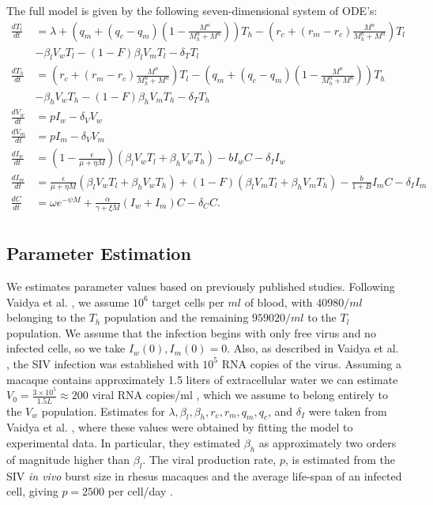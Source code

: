 \documentclass[11pt, oneside]{article}    %
\begin{document}
\vspace{5mm}

	The full model is given by the following seven-dimensional system of ODE's:
\begin{align*}
\frac{d T_l}{dt} & =  \lambda + \left(q_m + (q_c - q_m) \left(1- \frac{M^n}{M_h^n + M^n}\right) \right) T_h - \left(r_c + (r_m - r_c) \frac{M^n}{M_h^n + M^n} \right)T_l \\
 	&  - \beta_l V_w T_l - (1-F) \beta_l V_m T_l - \delta_T T_l\\
\frac{d T_h}{dt}  & =  \left(r_c + (r_m - r_c) \frac{M^n}{M_h^n + M^n} \right) T_l -  \left(q_m + (q_c - q_m) \left(1- \frac{M^n}{M_h^n + M^n}\right) \right) T_h \\
	& - \beta_h V_w T_h - (1-F) \beta_h V_m T_h - \delta_T T_h\\
\frac{d V_w}{dt}  & =  p I_w - \delta_V V_w \\
\frac{d V_m}{dt} & =  p I_m - \delta_V V_m \\
\frac{d I_w}{dt} & =  (1-\frac{\epsilon}{\mu + \eta M})(\beta_l V_w T_l + \beta_h V_w T_h) - b I_w C - \delta_I I_w \\
\frac{d I_m}{dt} & = \frac{\epsilon}{\mu + \eta M}(\beta_l V_w T_l + \beta_h V_w T_h) + (1-F) (\beta_l V_m T_l +\beta_h V_m T_h) -\frac{b} {1+B} I_m C -\delta_I I_m\\
\frac{d C}{dt} & =  \omega e^{-\psi M} + \frac{\alpha}{\gamma + \xi M}(I_w + I_m)C - \delta_C C.\\
\end{align*}

\subsection{Parameter Estimation}

	We estimates parameter values based on previously published studies. Following Vaidya et al. \cite{Vaidya}, we assume $10^6$ target cells per $ml$ of blood,  with $40980/ml$ belonging to the $T_h$ population and the remaining $959020/ml$ to the $T_l$ population. We assume that the infection begins with only free virus and no infected cells, so we take $I_w(0),I_m(0) = 0$. Also, as described in Vaidya et al. \cite{Vaidya}, the SIV infection was established with $10^5$ RNA copies of the virus. Assuming a macaque contains approximately 1.5 liters of extracellular water we can estimate $V_0 = \frac{3\times 10^5 }{1.5 L} \approx 200$ viral RNA copies/ml \cite{Vaidya}, which we assume to belong entirely to the $V_w$ population. Estimates for $\lambda, \beta_l, \beta_h, r_c, r_m, q_m, q_c$, and $\delta_I$ were taken from Vaidya et al. \cite{Vaidya}, where these values were obtained by fitting the model to experimental data. In particular, they estimated $\beta_h$ as approximately two orders of magnitude higher than $\beta_l$. The viral production rate, $p$, is estimated from the SIV \textit{in vivo} burst size in rhesus macaques and the average life-span of an infected cell, giving $p=2500$ per cell/day \cite{Vaidya}.
\end{document}

